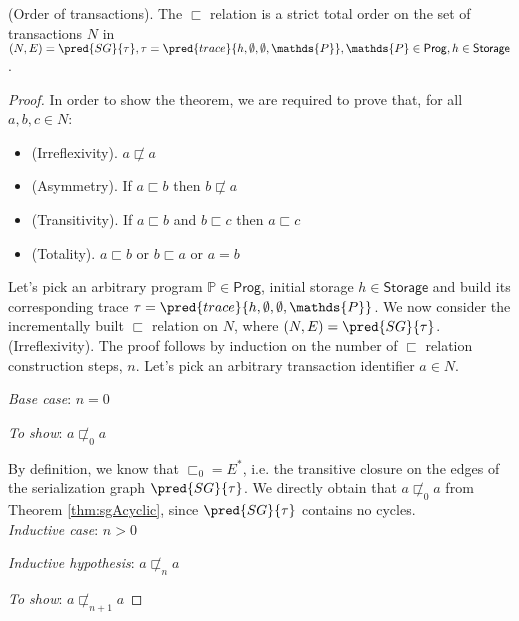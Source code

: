 \begin{thm}
	\label{thm:totOrder}
	(Order of transactions).
	The $\sqsubset$ relation is a strict total order on the set of transactions $N$ in $(N, E) = \pred{SG}{\tau}, \tau = \pred{trace}{h, \emptyset, \emptyset, \mathds{P}}, \mathds{P} \in \mathsf{Prog}, h \in \mathsf{Storage}$.

	\begin{proof}
	In order to show the theorem, we are required to prove that, for all $a, b, c \in N$:
	\begin{itemize}
		\item (Irreflexivity). $a \not\sqsubset a$
		\item (Asymmetry). If $a \sqsubset b$ then $b \not\sqsubset a$
		\item (Transitivity). If $a \sqsubset b$ and $b \sqsubset c$ then $a \sqsubset c$
		\item (Totality). $a \sqsubset b$ or $b \sqsubset a$ or $a = b$
	\end{itemize}
	
	Let's pick an arbitrary program $\mathds{P} \in \mathsf{Prog}$, initial storage $h \in \mathsf{Storage}$ and build its corresponding trace $\tau = \pred{trace}{h, \emptyset, \emptyset, \mathds{P}}$. We now consider the incrementally built $\sqsubset$ relation on $N$, where $(N, E) = \pred{SG}{\tau}$. \\
	\indline
	(Irreflexivity). The proof follows by induction on the number of $\sqsubset$ relation construction steps, $n$. Let's pick an arbitrary transaction identifier $a \in N$.
	
	{\parindent0pt
	\textit{Base case}: $n = 0$
	
	\textit{To show}: $a \not\sqsubset_0 a$
	
	By definition, we know that $\sqsubset_0 = E^*$, i.e. the transitive closure on the edges of the serialization graph $\pred{SG}{\tau}$. We directly obtain that $a \not\sqsubset_0 a$ from Theorem \ref{thm:sgAcyclic}, since $\pred{SG}{\tau}$ contains no cycles. \\
	
	\textit{Inductive case}: $n > 0$
	
	\textit{Inductive hypothesis}: $a \not\sqsubset_n a$
	
	\textit{To show}: $a \not\sqsubset_{n+1} a$
	
}
\end{proof}
\end{thm}
